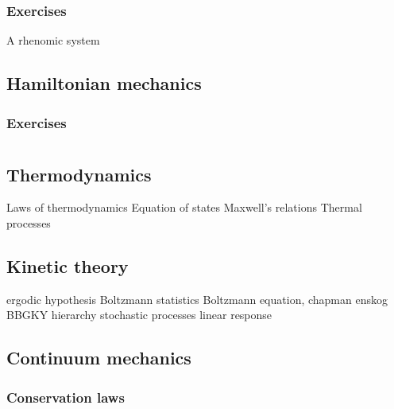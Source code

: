 \documentclass{../note}
\begin{document}
\section*{Exercises}
\begin{prb}[Brachiostochrone]
\end{prb}
\begin{prb}
\end{prb}
\begin{prb}
\end{prb}
\begin{prb}
A rhenomic system
\end{prb}
\begin{prb}
\end{prb}
\begin{prb}
\end{prb}


\chapter{Hamiltonian mechanics}

\section*{Exercises}




\part{}

\chapter{Thermodynamics}
Laws of thermodynamics
Equation of states
Maxwell's relations
Thermal processes

\chapter{Kinetic theory}
ergodic hypothesis
Boltzmann statistics
Boltzmann equation, chapman enskog
BBGKY hierarchy
stochastic processes
linear response

\chapter{Continuum mechanics}
\section{Conservation laws}
\end{document}
